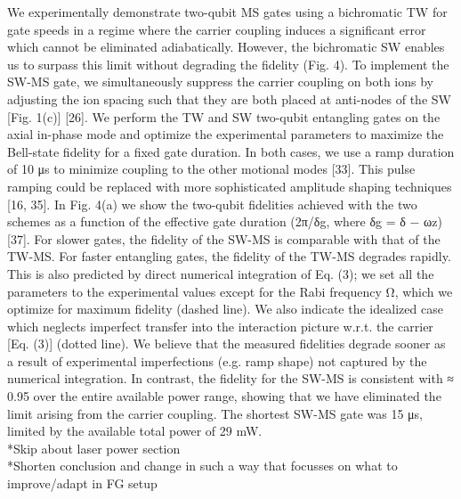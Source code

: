 \documentclass{article}
\begin{document}
    We experimentally demonstrate two-qubit MS gates using a bichromatic
    TW for gate speeds in a regime where the carrier coupling induces a
    significant error which cannot be eliminated adiabatically. However,
    the bichromatic SW enables us to surpass this limit without degrading
    the fidelity (Fig. 4). To implement the SW-MS gate, we simultaneously
    suppress the carrier coupling on both ions by adjusting the ion
    spacing such that they are both placed at anti-nodes of the SW
    [Fig. 1(c)] [26]. We perform the TW and SW two-qubit entangling gates
    on the axial in-phase mode and optimize the experimental parameters to
    maximize the Bell-state fidelity for a fixed gate duration. In both
    cases, we use a ramp duration of 10 μs to minimize coupling to the
    other motional modes [33]. This pulse ramping could be replaced with
    more sophisticated amplitude shaping techniques [16, 35]. In Fig. 4(a)
    we show the two-qubit fidelities achieved with the two schemes as a
    function of the effective gate duration (2π/δg, where δg = δ − ωz)
    [37]. For slower gates, the fidelity of the SW-MS is comparable with
    that of the TW-MS. For faster entangling gates, the fidelity of the
    TW-MS degrades rapidly. This is also predicted by direct numerical
    integration of Eq. (3); we set all the parameters to the experimental
    values except for the Rabi frequency Ω, which we optimize for maximum
    fidelity (dashed line). We also indicate the idealized case which
    neglects imperfect transfer into the interaction picture w.r.t. the
    carrier [Eq. (3)] (dotted line). We believe that the measured
    fidelities degrade sooner as a result of experimental imperfections
    (e.g. ramp shape) not captured by the numerical integration. In
    contrast, the fidelity for the SW-MS is consistent with ≈ 0.95 over
    the entire available power range, showing that we have eliminated the
    limit arising from the carrier coupling. The shortest SW-MS gate was
    15 μs, limited by the available total power of 29 mW. \\

    *Skip about laser power section \\

    *Shorten conclusion and change in such a way that focusses on what to
    improve/adapt in FG setup\\
\end{document}
